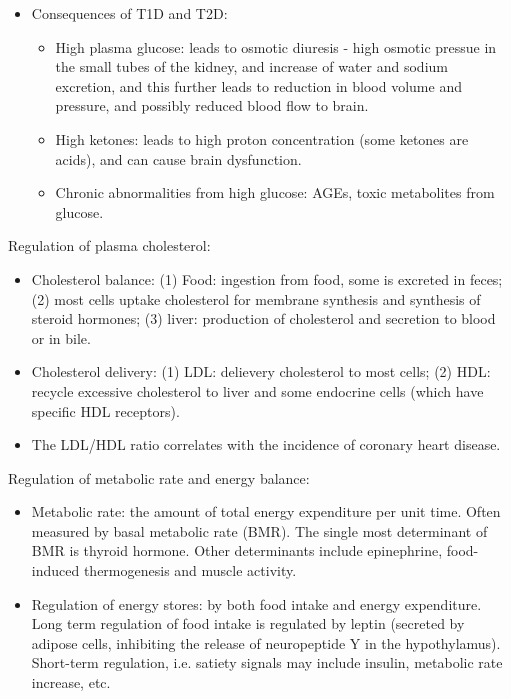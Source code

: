 \documentclass{report}
\begin{document}
\begin{enumerate}
\begin{itemize}
\item Consequences of T1D and T2D: 
\begin{itemize}
	\item High plasma glucose: leads to osmotic diuresis - high osmotic pressue in the small tubes of the kidney, and increase of water and sodium excretion, and this further leads to reduction in blood volume and pressure, and possibly reduced blood flow to brain. 
	\item High ketones: leads to high proton concentration (some ketones are acids), and can cause brain dysfunction. 
	\item Chronic abnormalities from high glucose: AGEs, toxic metabolites from glucose. 
\end{itemize}
\end{itemize}

Regulation of plasma cholesterol: 
\begin{itemize}
\item Cholesterol balance: (1) Food: ingestion from food, some is excreted in feces; (2) most cells uptake cholesterol for membrane synthesis and synthesis of steroid hormones; (3) liver: production of cholesterol and secretion to blood or in bile. 

\item Cholesterol delivery: (1) LDL: delievery cholesterol to most cells; (2) HDL: recycle excessive cholesterol to liver and some endocrine cells (which have specific HDL receptors). 

\item The LDL/HDL ratio correlates with the incidence of coronary heart disease.
\end{itemize}

Regulation of metabolic rate and energy balance: 
\begin{itemize}
\item Metabolic rate: the amount of total energy expenditure per unit time. Often measured by basal metabolic rate (BMR). The single most determinant of BMR is thyroid hormone. Other determinants include epinephrine, food-induced thermogenesis and muscle activity. 

\item Regulation of energy stores: by both food intake and energy expenditure. Long term regulation of food intake is regulated by leptin (secreted by adipose cells, inhibiting the release of neuropeptide Y in the hypothylamus). Short-term regulation, i.e. satiety signals may include insulin, metabolic rate increase, etc. 


\end{itemize}
\end{enumerate}
\end{document}

